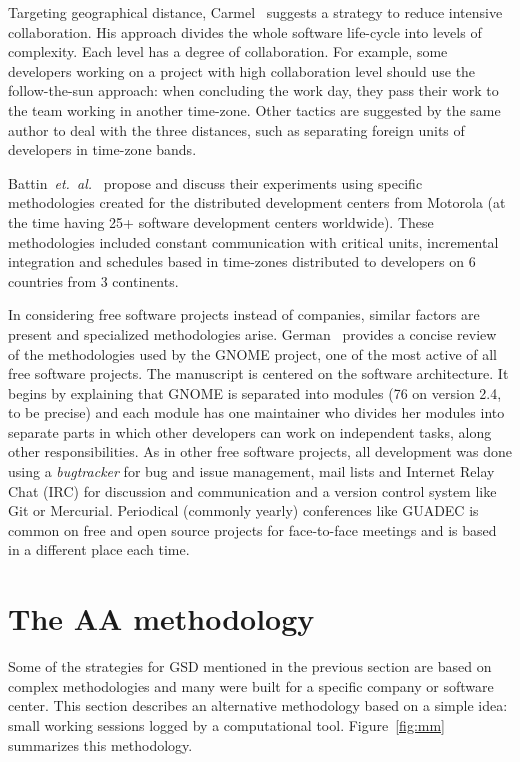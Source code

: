 \documentclass{article}
\newcommand{\etal}{{\it et.~al.}}
\begin{document}
Targeting geographical distance, Carmel~\cite{carmel2001} suggests a
strategy to reduce intensive collaboration. His approach divides the
whole software life-cycle into levels of complexity. Each level has a
degree of collaboration. For example, some developers working on a
project with high collaboration level should use the follow-the-sun
approach: when concluding the work day, they pass their work to the
team working in another time-zone. Other tactics are suggested by the
same author to deal with the three distances, such as separating foreign
units of developers in time-zone bands.

Battin~\etal~\cite{battin2001} propose and discuss their experiments using
specific methodologies created for the distributed development centers from
Motorola (at the time having 25+ software development centers worldwide). These
methodologies included constant communication with critical units, incremental
integration and schedules based in time-zones distributed to developers on 6
countries from 3 continents.

In considering free software projects instead of companies,
similar factors are present and specialized methodologies
arise. German~\cite{german2003} provides a concise review of
the methodologies used by the GNOME project, one of the most active of all free
software projects. The manuscript is centered on the software architecture. It
begins by explaining that GNOME is separated into modules (76 on version 2.4, to be
precise) and each module has one maintainer who divides her modules into
separate parts in which other developers can work on independent tasks, along
other responsibilities. As in other free software projects, all 
development was done using a \emph{bugtracker} for bug and issue management,
mail lists and Internet Relay Chat (IRC) for discussion and communication and a
version control system like Git or Mercurial. Periodical (commonly yearly)
conferences like GUADEC is common on free and open source projects for
face-to-face meetings and is based in a different place each time.


\section{The AA methodology}
\label{aa-methodology}

Some of the strategies for GSD mentioned in the previous section are based on
complex methodologies and many were built for a specific company or software
center. This section describes an alternative methodology based on a simple idea: small
working sessions logged by a computational tool. Figure~\ref{fig:mm} summarizes
this methodology.
\end{document}
